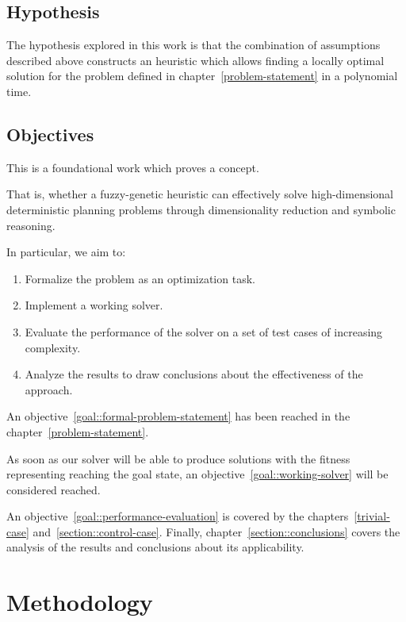 \documentclass[12pt, a4paper]{report}
\begin{document}
	\section{Hypothesis}
	The hypothesis explored in this work is that the combination of assumptions described above constructs an heuristic which allows finding a locally optimal solution for the problem defined in chapter~\ref{problem-statement} in a polynomial time.
	
	\section{Objectives}\label{section::objectives}
	
	This is a foundational work which proves a concept.
	
	That is, whether a fuzzy-genetic heuristic can effectively solve high-dimensional deterministic planning problems through dimensionality reduction and symbolic reasoning.
	
	In particular, we aim to:
	\begin{enumerate}
		\item\label{goal::formal-problem-statement} Formalize the problem as an optimization task.
		\item\label{goal::working-solver} Implement a working solver.
		\item\label{goal::performance-evaluation} Evaluate the performance of the solver on a set of test cases of increasing complexity.
		\item\label{goal::conclusions} Analyze the results to draw conclusions about the effectiveness of the approach.
	\end{enumerate}

	An objective~\ref{goal::formal-problem-statement} has been reached in the chapter~\ref{problem-statement}.
	
	As soon as our solver will be able to produce solutions with the fitness representing reaching the goal state, an objective~\ref{goal::working-solver} will be considered reached.
	
	An objective~\ref{goal::performance-evaluation} is covered by the chapters~\ref{trivial-case} and~\ref{section::control-case}.
	Finally, chapter~\ref{section::conclusions} covers the analysis of the results and conclusions about its applicability.
	
	\chapter{Methodology}\label{methodology}
\end{document}
